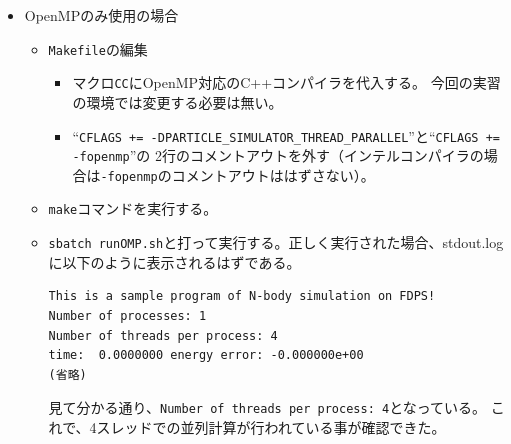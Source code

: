\documentclass[12pt,a4paper,dvipdfmx]{jarticle}
\begin{document}
\begin{itemize}
\item OpenMPのみ使用の場合
  \begin{itemize}
  \item \texttt{Makefile}の編集
    \begin{itemize}
    \item マクロ\texttt{CC}にOpenMP対応のC++コンパイラを代入する。
          今回の実習の環境では変更する必要は無い。
    \item ``\texttt{CFLAGS += -DPARTICLE\_SIMULATOR\_THREAD\_PARALLEL}''と``\texttt{CFLAGS += -fopenmp}''の
      2行のコメントアウトを外す（インテルコンパイラの場合は\texttt{-fopenmp}のコメントアウトははずさない）。
    \end{itemize}
  \item \texttt{make}コマンドを実行する。
  \item \texttt{sbatch runOMP.sh}と打って実行する。正しく実行された場合、stdout.logに以下のように表示されるはずである。
\begin{screen}
\begin{verbatim}
This is a sample program of N-body simulation on FDPS!
Number of processes: 1
Number of threads per process: 4
time:  0.0000000 energy error: -0.000000e+00
(省略)
\end{verbatim}
\end{screen}
       見て分かる通り、\texttt{Number of threads per process: 4}となっている。
       これで、4スレッドでの並列計算が行われている事が確認できた。
  \end{itemize}


\end{itemize}
\end{document}

